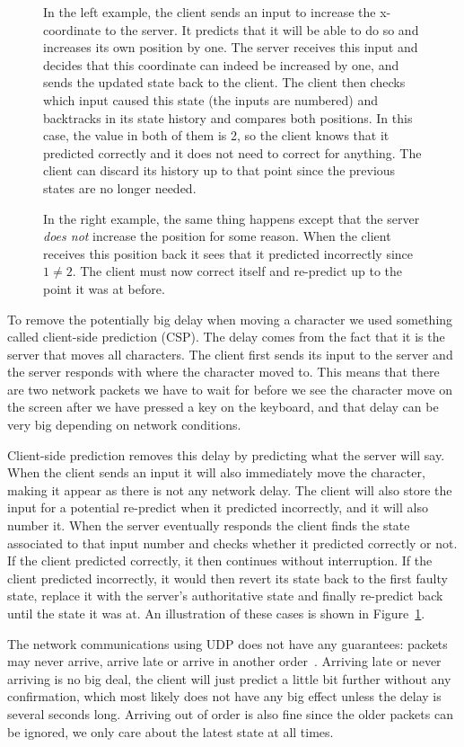 \documentclass[a4paper]{article}
\begin{document}
\begin{figure}[!ht]
{    In the left example, the client sends an input to increase the x-coordinate to the server. It predicts that it will be able to do so and increases its own position by one. The server receives this input and decides that this coordinate can indeed be increased by one, and sends the updated state back to the client. The client then checks which input caused this state (the inputs are numbered) and backtracks in its state history and compares both positions. In this case, the value in both of them is 2, so the client knows that it predicted correctly and it does not need to correct for anything. The client can discard its history up to that point since the previous states are no longer needed.

    In the right example, the same thing happens except that the server \emph{does not} increase the position for some reason. When the client receives this position back it sees that it predicted incorrectly since $1 \ne 2$. The client must now correct itself and re-predict up to the point it was at before.}
    \label{fig:csp}
\end{figure}

To remove the potentially big delay when moving a character we used something called client-side prediction (CSP). The delay comes from the fact that it is the server that moves all characters. The client first sends its input to the server and the server responds with where the character moved to. This means that there are two network packets we have to wait for before we see the character move on the screen after we have pressed a key on the keyboard, and that delay can be very big depending on network conditions.

Client-side prediction removes this delay by predicting what the server will say. When the client sends an input it will also immediately move the character, making it appear as there is not any network delay. The client will also store the input for a potential re-predict when it predicted incorrectly, and it will also number it. When the server eventually responds the client finds the state associated to that input number and checks whether it predicted correctly or not. If the client predicted correctly, it then continues without interruption. If the client predicted incorrectly, it would then revert its state back to the first faulty state, replace it with the server's authoritative state and finally re-predict back until the state it was at. An illustration of these cases is shown in Figure~\ref{fig:csp}.

The network communications using UDP does not have any guarantees: packets may never arrive, arrive late or arrive in another order~\cite{rfc768}. Arriving late or never arriving is no big deal, the client will just predict a little bit further without any confirmation, which most likely does not have any big effect unless the delay is several seconds long. Arriving out of order is also fine since the older packets can be ignored, we only care about the latest state at all times.
\end{document}

